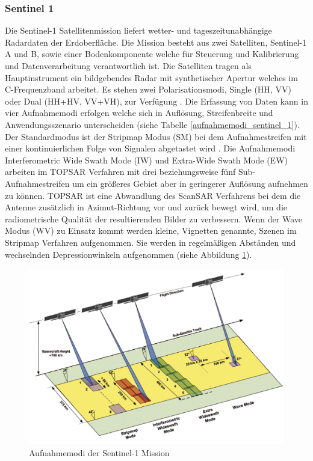 \subsubsection{Sentinel 1}
Die Sentinel-1 Satellitenmission liefert wetter- und tageszeitunabhängige Radardaten der Erdoberfläche. Die Mission besteht aus zwei Satelliten, Sentinel-1 A und B,
sowie einer Bodenkomponente welche für Steuerung und Kalibrierung und Datenverarbeitung verantwortlich ist. Die Satelliten tragen als Hauptinstrument ein 
bildgebendes Radar mit synthetischer Apertur welches im C-Frequenzband arbeitet. Es stehen zwei Polarisationsmodi, Single (HH, VV) oder Dual (HH+HV, VV+VH),
zur Verfügung \cite{sentinel_1_definition}. 
Die Erfassung von Daten kann in vier Aufnahmemodi erfolgen welche sich in Auflösung, Streifenbreite und Anwendungsszenario unterscheiden (siehe Tabelle \ref{aufnahmemodi_sentinel_1}). 
Der Standardmodus ist der Stripmap Modus (SM) bei dem Aufnahmestreifen mit einer kontinuierlichen Folge von Signalen abgetastet wird \cite{sentinel_1_definition}.
Die Aufnahmemodi Interferometric Wide Swath Mode (IW) und Extra-Wide Swath Mode (EW) arbeiten im TOPSAR Verfahren mit drei beziehungsweise
fünf Sub-Aufnahmestreifen um ein größeres Gebiet aber in geringerer Auflösung aufnehmen zu können. TOPSAR ist eine Abwandlung des ScanSAR Verfahrens bei 
dem die Antenne zusätzlich in Azimut-Richtung vor und zurück bewegt wird, um die radiometrische Qualität der resultierenden Bilder zu verbessern. 
Wenn der Wave Modus (WV) zu Einsatz kommt werden kleine, Vignetten genannte, Szenen im Stripmap Verfahren aufgenommen. Sie werden in regelmäßigen Abständen und
wechselnden Depressionwinkeln aufgenommen (siehe Abbildung \ref{sar_modi_sentinel_1})\cite{tutorial_on_sar}\cite{sentinel_1_definition}.   

\begin{figure}[H]
    \centering
    \includegraphics[width=\textwidth]{Bilder/Aquisition_Modes.png}
    \caption{Aufnahmemodi der Sentinel-1 Mission \cite{sentinel_1_overview}}
    \label{sar_modi_sentinel_1}
\end{figure}

